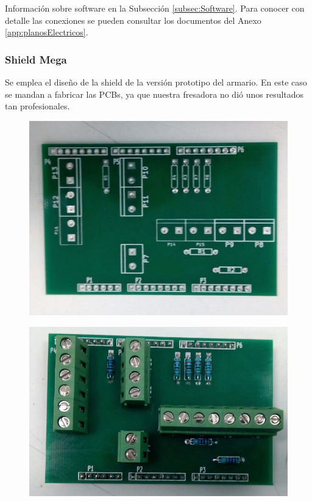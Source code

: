 Información sobre software en la Subsección \ref{subsec:Software}. Para conocer con detalle las conexiones se pueden consultar los documentos del Anexo \ref{app:planosElectricos}.

\subsubsection{Shield Mega}
Se emplea el diseño de la shield de la versión prototipo del armario. En este caso se mandan a fabricar las PCBs, ya que nuestra fresadora no dió unos resultados tan profesionales.

\begin{figure}
\centering
\begin{minipage}{.5\textwidth}
  \centering
  \includegraphics[width=.9\textwidth]{Figures/pcbMega}
  \label{fig:pcbdMega}
\end{minipage}%
\begin{minipage}{.5\textwidth}
  \centering
  \includegraphics[width=.9\textwidth]{Figures/shieldMega}
  \label{fig:shieldMega}
\end{minipage}
\end{figure}

